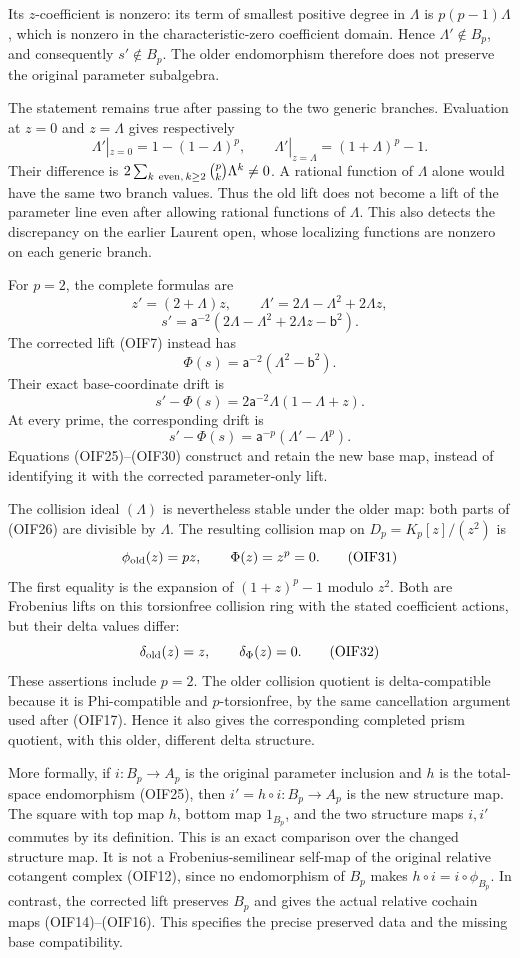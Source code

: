 \documentclass[
]{article}
\begin{document}
Its \(z\)-coefficient is nonzero: its term of smallest positive degree
in \(\Lambda\) is \(p(p-1)\Lambda\), which is nonzero in the
characteristic-zero coefficient domain. Hence \(\Lambda'\notin B_p\),
and consequently \(s'\notin B_p\). The older endomorphism therefore does
not preserve the original parameter subalgebra.

The statement remains true after passing to the two generic branches.
Evaluation at \(z=0\) and \(z=\Lambda\) gives respectively \[
\Lambda'|_{z=0}=1-(1-\Lambda)^p,\qquad
\Lambda'|_{z=\Lambda}=(1+\Lambda)^p-1.
\tag{OIF27}
\] Their difference is
\(2\sum_{k\ {\rm even},\,k\ge2}\binom pk\Lambda^k\ne0\). A rational
function of \(\Lambda\) alone would have the same two branch values.
Thus the old lift does not become a lift of the parameter line even
after allowing rational functions of \(\Lambda\). This also detects the
discrepancy on the earlier Laurent open, whose localizing functions are
nonzero on each generic branch.

For \(p=2\), the complete formulas are \[
z'=(2+\Lambda)z,\qquad
\Lambda'=2\Lambda-\Lambda^2+2\Lambda z,
\] \[
s'=\mathsf a^{-2}
(2\Lambda-\Lambda^2+2\Lambda z-\mathsf b^2).
\tag{OIF28}
\] The corrected lift (OIF7) instead has \[
\Phi(s)=\mathsf a^{-2}(\Lambda^2-\mathsf b^2).
\] Their exact base-coordinate drift is \[
s'-\Phi(s)
=2\mathsf a^{-2}\Lambda(1-\Lambda+z).
\tag{OIF29}
\] At every prime, the corresponding drift is \[
s'-\Phi(s)=\mathsf a^{-p}(\Lambda'-\Lambda^p).
\tag{OIF30}
\] Equations (OIF25)--(OIF30) construct and retain the new base map,
instead of identifying it with the corrected parameter-only lift.

The collision ideal \((\Lambda)\) is nevertheless stable under the older
map: both parts of (OIF26) are divisible by \(\Lambda\). The resulting
collision map on \(D_p=K_p[z]/(z^2)\) is \[
\phi_{\rm old}(z)=pz,\qquad
\Phi(z)=z^p=0.
\tag{OIF31}
\] The first equality is the expansion of \((1+z)^p-1\) modulo \(z^2\).
Both are Frobenius lifts on this torsionfree collision ring with the
stated coefficient actions, but their delta values differ: \[
\delta_{\rm old}(z)=z,\qquad \delta_{\Phi}(z)=0.
\tag{OIF32}
\] These assertions include \(p=2\). The older collision quotient is
delta-compatible because it is Phi-compatible and \(p\)-torsionfree, by
the same cancellation argument used after (OIF17). Hence it also gives
the corresponding completed prism quotient, with this older, different
delta structure.

More formally, if \(i:B_p\to A_p\) is the original parameter inclusion
and \(h\) is the total-space endomorphism (OIF25), then
\(i'=h\circ i:B_p\to A_p\) is the new structure map. The square with top
map \(h\), bottom map \(1_{B_p}\), and the two structure maps \(i,i'\)
commutes by its definition. This is an exact comparison over the changed
structure map. It is not a Frobenius-semilinear self-map of the original
relative cotangent complex (OIF12), since no endomorphism of \(B_p\)
makes \(h\circ i=i\circ\phi_{B_p}\). In contrast, the corrected lift
preserves \(B_p\) and gives the actual relative cochain maps
(OIF14)--(OIF16). This specifies the precise preserved data and the
missing base compatibility.
\end{document}
